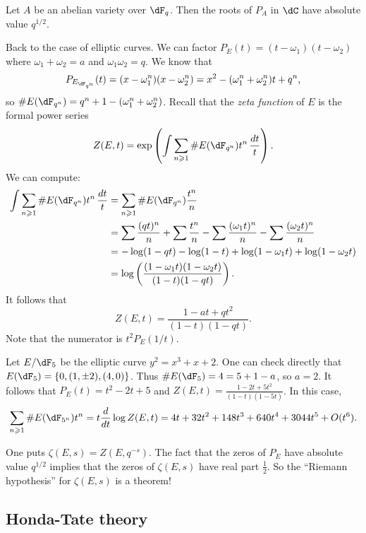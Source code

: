 \documentclass{article}
\begin{document}
\begin{theorem}[Weil]
Let $A$ be an abelian variety over $\dF_q$. Then the roots of $P_A$ in $\dC$ 
have absolute value $q^{1/2}$. 
\end{theorem}

Back to the case of elliptic curves. We can factor 
$P_E(t)=(t-\omega_1)(t-\omega_2)$ where $\omega_1+\omega_2=a$ and 
$\omega_1 \omega_2 = q$. We know that 
\[
  P_{E_{\dF_{q^n}}}(t) = (x-\omega_1^n)(x-\omega_2^n) 
    = x^2 - (\omega_1^n + \omega_2^n) t + q^n \text{,}
\]
so $\# E(\dF_{q^n}) = q^n+1 - (\omega_1^n+\omega_2^n)$. Recall that the 
\emph{zeta function} of $E$ is the formal power series 
\[
  Z(E,t) = \exp\left(\int \sum_{n\geqslant 1} \# E(\dF_{q^n}) t^n\, \frac{dt}{t}\right) \text{.}
\]
We can compute:
\begin{align*}
  \int \sum_{n\geqslant 1} \# E(\dF_{q^n}) t^n\, \frac{dt}{t}
    &= \sum_{n\geqslant 1} \# E(\dF_{q^n}) \frac{t^n}{n} \\
    &= \sum \frac{(q t)^n}{n} + \sum \frac{t^n}{n} - \sum \frac{(\omega_1 t)^n}{n} - \sum \frac{(\omega_2 t)^n}{n} \\
    &= -\log(1-q t) - \log(1-t) + \log(1-\omega_1 t) + \log(1-\omega_2 t) \\
    &= \log\left(\frac{(1-\omega_1 t)(1-\omega_2 t)}{(1-t)(1-q t)} \right) \text{.}
\end{align*}
It follows that 
\[
  Z(E,t) = \frac{1-a t+q t^2}{(1-t)(1-q t)} \text{.}
\]
Note that the numerator is $t^2 P_E(1/t)$. 

\begin{example}
Let $E/\dF_5$ be the elliptic curve $y^2=x^3+x+2$. One can check directly that 
$E(\dF_5) = \{0,(1,\pm 2), (4,0)\}$. Thus $\# E(\dF_5) = 4=5+1-a$, so $a=2$. 
It follows that $P_E(t) = t^2-2 t+5$ and 
$Z(E,t) =\frac{1-2 t+5 t^2}{(1-t)(1-5 t)}$. In this case, 
\[
  \sum_{n\geqslant 1} \# E(\dF_{5^n}) t^n = t\frac{d}{dt}\log Z(E,t)
    = 4t + 32 t^2 + 148 t^3 + 640 t^4 + 3044 t^5 + O(t^6) \text{.}
\]
\end{example}

One puts $\zeta(E,s) = Z(E,q^{-s})$. The fact that the zeros of 
$P_E$ have absolute value $q^{1/2}$ implies that the zeros of 
$\zeta(E,s)$ have real part $\frac 1 2$. So the ``Riemann hypothesis'' for 
$\zeta(E,s)$ is a theorem!


\subsection*{Honda-Tate theory}
\end{document}

